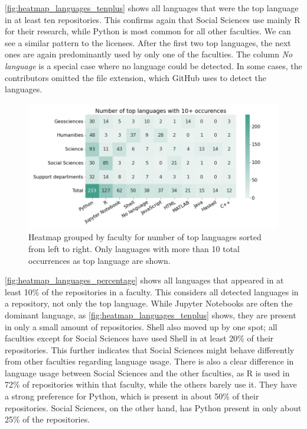 

\autoref{fig:heatmap_languages_tenplus} shows all languages that were the top language in at least ten repositories. This confirms again that Social Sciences use mainly R for their research, while Python is most common for all other faculties. We can see a similar pattern to the licenses. After the first two top languages, the next ones are again predominantly used by only one of the faculties. The column \textit{No language} is a special case where no language could be detected. In some cases, the contributors omitted the file extension, which GitHub uses to detect the languages.

\begin{figure}[h!]
\centerline{
\includegraphics[scale=0.5]{figures_results/heatmap_languages_tenplus.png}}
\caption{Heatmap grouped by faculty for number of top languages sorted from left to right. Only languages with more than 10 total occurrences as top language are shown.
\label{fig:heatmap_languages_tenplus}}
\end{figure}

\autoref{fig:heatmap_languages_percentage} shows all languages that appeared in at least 10\% of the repositories in a faculty. This considers all detected languages in a repository, not only the top language. While Jupyter Notebooks are often the dominant language, as \autoref{fig:heatmap_languages_tenplus} shows, they are present in only a small amount of repositories. Shell also moved up by one spot; all faculties except for Social Sciences have used Shell in at least 20\% of their repositories. This further indicates that Social Sciences might behave differently from other faculties regarding language usage. 
There is also a clear difference in language usage between Social Sciences and the other faculties, as R is used in 72\% of repositories within that faculty, while the others barely use it. They have a strong preference for Python, which is present in about 50\% of their repositories. Social Sciences, on the other hand, has Python present in only about 25\% of the repositories.

